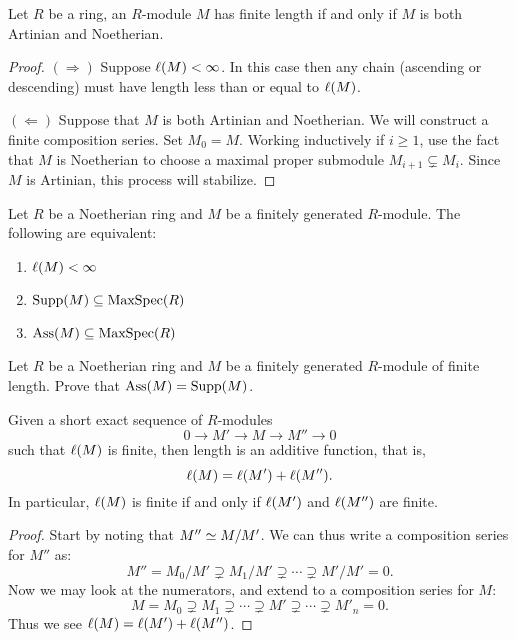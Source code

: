 \documentclass{ximera}
\begin{document}
\begin{corollary}
  Let $R$ be a ring, an $R$-module $M$ has finite length if and only
  if $M$ is both Artinian and Noetherian.
  \begin{proof}
    $(\Rightarrow)$ Suppose $\ell(M)<\infty$. In this case then any
    chain (ascending or descending) must have length less than or
    equal to $\ell(M)$.

    $(\Leftarrow)$ Suppose that $M$ is both Artinian and Noetherian.
    We will construct a finite composition series. Set $M_0 =
    M$. Working inductively if $i\ge 1$, use the fact that $M$ is
    Noetherian to choose a maximal proper submodule $M_{i+1}\subsetneq
    M_i$. Since $M$ is Artinian, this process will stabilize.
  \end{proof}
\end{corollary}



\begin{exercise}
  Let $R$ be a Noetherian ring and $M$ be a finitely generated
  $R$-module. The following are equivalent:
  \begin{enumerate}
  \item $\ell(M)<\infty$
  \item $\operatorname{Supp}(M)\subseteq\operatorname{MaxSpec}(R)$
  \item $\operatorname{Ass}(M)\subseteq\operatorname{MaxSpec}(R)$
  \end{enumerate}
\end{exercise}

\begin{exercise}
  Let $R$ be a Noetherian ring and $M$ be a finitely generated
  $R$-module of finite length. Prove that $\operatorname{Ass}(M) = \operatorname{Supp}(M)$.
\end{exercise}





\begin{proposition}\label{P:AL}
  Given a short exact sequence of $R$-modules
  \[
  0\to M' \to M\to M'' \to 0
  \]
  such that $\ell(M)$ is finite, then length is an additive function, that is,
  \[
  \ell(M) = \ell(M')+\ell(M'').
  \]
  In particular, $\ell(M)$ is finite if and only if $\ell(M')$ and
  $\ell(M'')$ are finite.
  \begin{proof}
    Start by noting that $M''\simeq M/M'$. We can thus write a
    composition series for $M''$ as:
    \[
    M'' = M_0/M' \supsetneq M_1/M' \supsetneq \cdots \supsetneq M'/M'  = 0.
    \]
    Now we may look at the numerators, and extend to a composition
    series for $M$:
    \[
    M = M_0 \supsetneq M_1 \supsetneq \cdots \supsetneq M' \supsetneq \cdots \supsetneq M'_n = 0.
    \]
    Thus we see $\ell(M) = \ell(M')+\ell(M'')$.
  \end{proof}
\end{proposition}
\end{document}
